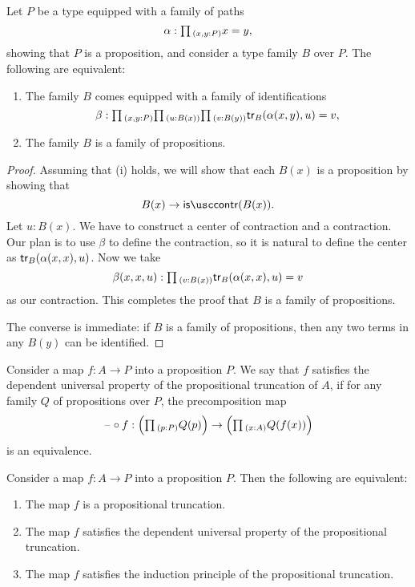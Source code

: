 \begin{lem}
  Let $P$ be a type equipped with a family of paths
  \begin{equation*}
    \alpha : \prd{x,y:P}x=y,
  \end{equation*}
  showing that $P$ is a proposition, and consider a type family $B$ over $P$. The following are equivalent:
  \begin{enumerate}
  \item The family $B$ comes equipped with a family of identifications
    \begin{equation*}
      \beta:\prd{x,y:P}{u:B(x)}{v:B(y)}\tr_B(\alpha(x,y),u)=v,
    \end{equation*}
  \item The family $B$ is a family of propositions.
  \end{enumerate}
\end{lem}

\begin{proof}
  Assuming that (i) holds, we will show that each $B(x)$ is a proposition by showing that
  \begin{equation*}
    B(x)\to\iscontr(B(x)).
  \end{equation*}
  Let $u:B(x)$. We have to construct a center of contraction and a contraction. Our plan is to use $\beta$ to define the contraction, so it is natural to define the center as $\mathsf{tr}_B(\alpha(x,x),u)$. Now we take
  \begin{equation*}
    \beta(x,x,u):\prd{v:B(x)}\tr_B(\alpha(x,x),u)=v
  \end{equation*}
  as our contraction. This completes the proof that $B$ is a family of propositions.

  The converse is immediate: if $B$ is a family of propositions, then any two terms in any $B(y)$ can be identified.
\end{proof}

\begin{defn}
  Consider a map $f:A\to P$ into a proposition $P$. We say that $f$ satisfies the dependent universal property of the propositional truncation of $A$, if for any family $Q$ of propositions over $P$, the precomposition map
  \begin{equation*}
    \blank\circ f : \Big(\prd{p:P}Q(p)\Big)\to\Big(\prd{x:A}Q(f(x))\Big)
  \end{equation*}
  is an equivalence.
\end{defn}

\begin{thm}
  Consider a map $f:A\to P$ into a proposition $P$. Then the following are equivalent:
  \begin{enumerate}
  \item The map $f$ is a propositional truncation.
  \item The map $f$ satisfies the dependent universal property of the propositional truncation.
  \item The map $f$ satisfies the induction principle of the propositional truncation.
  \end{enumerate}
\end{thm}


